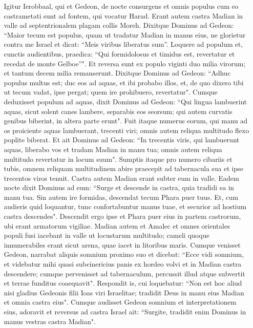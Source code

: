 \begin{biblechapter}  
\verse Igitur Ierobbaal, qui et Gedeon, de nocte consurgens et omnis populus cum eo castrametati sunt ad fontem, qui vocatur Harad. Erant autem castra Madian in valle ad septentrionalem plagam collis Moreh. 
\verse Dixitque Dominus ad Gedeon: “Maior tecum est populus, quam ut tradatur Madian in manus eius, ne glorietur contra me Israel et dicat: “Meis viribus liberatus sum”. 
\verse Loquere ad populum et, cunctis audientibus, praedica: “Qui formidolosus et timidus est, revertatur et recedat de monte Gelboe”". Et reversa sunt ex populo viginti duo milia virorum; et tantum decem milia remanserunt. 
\verse Dixitque Dominus ad Gedeon: “Adhuc populus multus est; duc eos ad aquas, et ibi probabo illos, et, de quo dixero tibi ut tecum vadat, ipse pergat; quem ire prohibuero, revertatur". 
\verse Cumque deduxisset populum ad aquas, dixit Dominus ad Gedeon: “Qui lingua lambuerint aquas, sicut solent canes lambere, separabis eos seorsum; qui autem curvatis genibus biberint, in altera parte erunt". 
\verse Fuit itaque numerus eorum, qui manu ad os proiciente aquas lambuerant, trecenti viri; omnis autem reliqua multitudo flexo poplite biberat. 
\verse Et ait Dominus ad Gedeon: “In trecentis viris, qui lambuerunt aquas, liberabo vos et tradam Madian in manu tua; omnis autem reliqua multitudo revertatur in locum suum". 
\verse Sumptis itaque pro numero cibariis et tubis, omnem reliquam multitudinem abire praecepit ad tabernacula sua et ipse trecentos viros tenuit. Castra autem Madian erant subter eum in valle. 
\verse Eadem nocte dixit Dominus ad eum: “Surge et descende in castra, quia tradidi ea in manu tua. 
\verse Sin autem ire formidas, descendat tecum Phara puer tuus.  
\verse Et, cum audieris quid loquantur, tunc confortabuntur manus tuae, et securior ad hostium castra descendes". Descendit ergo ipse et Phara puer eius in partem castrorum, ubi erant armatorum vigiliae. 
\verse Madian autem et Amalec et omnes orientales populi fusi iacebant in valle ut locustarum multitudo; cameli quoque innumerabiles erant sicut arena, quae iacet in litoribus maris. 
\verse Cumque venisset Gedeon, narrabat aliquis somnium proximo suo et dicebat: “Ecce vidi somnium, et videbatur mihi quasi subcinericius panis ex hordeo volvi et in Madian castra descendere; cumque pervenisset ad tabernaculum, percussit illud atque subvertit et terrae funditus coaequavit". 
\verse Respondit is, cui loquebatur: “Non est hoc aliud nisi gladius Gedeonis filii Ioas viri Israelitae; tradidit Deus in manu eius Madian et omnia castra eius". 
\verse Cumque audisset Gedeon somnium et interpretationem eius, adoravit et reversus ad castra Israel ait: “Surgite, tradidit enim Dominus in manus vestras castra Madian". 

\end{biblechapter}
